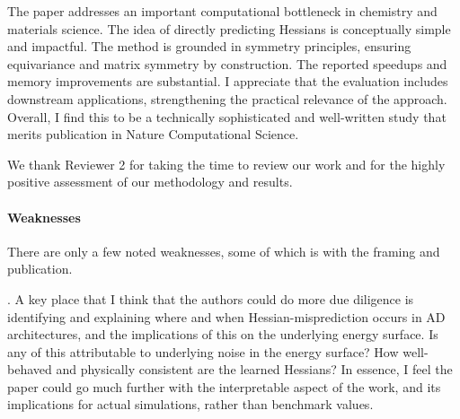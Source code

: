 \documentclass[pdflatex,sn-mathphys-num]{sn-jnl}
\begin{document}
\noindent The paper addresses an important computational bottleneck in chemistry and materials science. The idea of directly predicting Hessians is conceptually simple and impactful. The method is grounded in symmetry principles, ensuring equivariance and matrix symmetry by construction. The reported speedups and memory improvements are substantial. I appreciate that the evaluation includes downstream applications, strengthening the practical relevance of the approach. Overall, I find this to be a technically sophisticated and well-written study that merits publication in Nature Computational Science.

\vspace{2mm}
{\color{mycustomcolour}
\noindent We thank Reviewer 2 for taking the time to review our work and for the highly positive assessment of our methodology and results.
}
\vspace{5mm}

\paragraph{Weaknesses}

\noindent There are only a few noted weaknesses, some of which is with the framing and publication.


. A key place that I think that the authors could do more due diligence is identifying and explaining where and when Hessian-misprediction occurs in AD architectures, and the implications of this on the underlying energy surface. Is any of this attributable to underlying noise in the energy surface? How well-behaved and physically consistent are the learned Hessians? In essence, I feel the paper could go much further with the interpretable aspect of the work, and its implications for actual simulations, rather than benchmark values.
\end{document}
